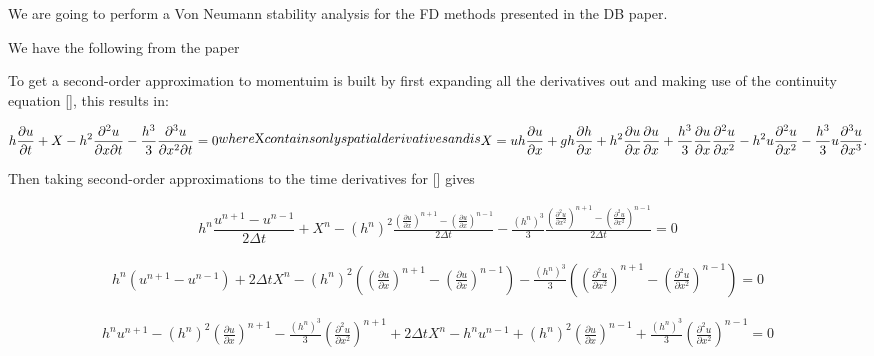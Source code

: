 \documentclass[12pt]{article}
\begin{document}
We are going to perform a Von Neumann stability analysis for the FD methods presented in the DB paper.


We have the following from the paper

To get a second-order approximation to momentuim is built by first expanding all the derivatives out and making use of the continuity equation [], this results in:

	\begin{subequations}
		\begin{gather}
		h\dfrac{\partial u}{\partial t} + X - h^2\frac{\partial^2 u}{\partial x \partial t} - \frac{h^3}{3}\frac{\partial^3 u}{\partial x^2 \partial t}  =0 
		\label{eq:expandedu}
		\end{gather}
		where $X$ contains only spatial derivatives and is
		\begin{gather}
		X = uh\frac{\partial u}{\partial x} + gh\frac{\partial h}{\partial x} + h^2\frac{\partial u}{\partial x}\frac{\partial u}{\partial x} + \frac{h^3}{3}\frac{\partial u}{\partial x}\frac{\partial^2 u}{\partial x^2} - h^2u\frac{\partial^2 u}{\partial x^2}- \frac{h^3}{3}u\frac{\partial^3 u}{\partial x^3} .
		\end{gather}
	\end{subequations}

Then taking second-order approximations to the time derivatives for [] gives

	\begin{gather}
	h^{n}\dfrac{u^{n+1} - u^{n-1}}{2 \Delta t} + X^{n} - \left(h^{n}\right)^2\frac{ \left(\frac{\partial u}{\partial x}\right)^{n+1} - \left(\frac{\partial u}{\partial x}\right)^{n-1} }{2 \Delta t} - \frac{\left(h^{n}\right)^3}{3}\frac{ \left(\frac{\partial^2 u}{\partial x^2}\right)^{n+1} - \left(\frac{\partial^2 u}{\partial x^2}\right)^{n-1} }{2 \Delta t}  =0 
	\label{eq:expandedutdisc}
	\end{gather}

	\begin{gather}
	h^{n} \left(u^{n+1} - u^{n-1}\right) + 2\Delta tX^{n} - \left(h^{n}\right)^2 \left(\left(\frac{\partial u}{\partial x}\right)^{n+1} - \left(\frac{\partial u}{\partial x}\right)^{n-1}\right) - \frac{\left(h^{n}\right)^3}{3}\left(\left(\frac{\partial^2 u}{\partial x^2}\right)^{n+1} - \left(\frac{\partial^2 u}{\partial x^2}\right)^{n-1} \right)  =0 
	\label{eq:expandedutdisc1}
	\end{gather}



	\begin{gather}
	h^{n}u^{n+1} - \left(h^{n}\right)^2 \left(\frac{\partial u}{\partial x}\right)^{n+1} - \frac{\left(h^{n}\right)^3}{3}\left(\frac{\partial^2 u}{\partial x^2}\right)^{n+1}  + 2\Delta tX^{n} - h^{n}u^{n-1} + \left(h^{n}\right)^2\left(\frac{\partial u}{\partial x}\right)^{n-1} + \frac{\left(h^{n}\right)^3}{3}\left(\frac{\partial^2 u}{\partial x^2}\right)^{n-1}   =0 
	\label{eq:expandedutdisc2}
	\end{gather}
\end{document}
